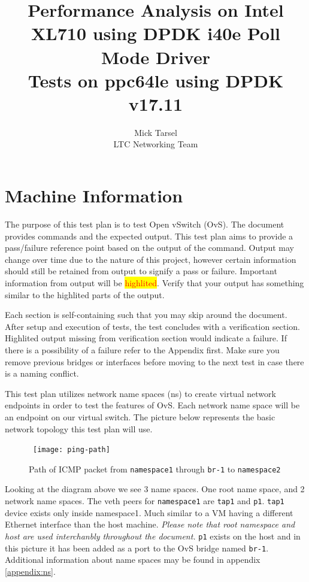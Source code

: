 \documentclass[letter]{article}
\title{Performance Analysis on Intel XL710 using DPDK i40e Poll Mode Driver \\ Tests on ppc64le using DPDK v17.11}
\author{Mick Tarsel \\  LTC Networking Team \\}
\begin{document}

\maketitle

\newpage
\tableofcontents
\newpage

\section{Machine Information}

The purpose of this test plan is to test Open vSwitch (OvS). 
The document provides commands and the expected output.
This test plan aims to provide a pass/failure reference point based on the output of the command.
Output may change over time due to the nature of this project, however certain information should still be retained from output to signify a pass or failure.
Important information from output will be \setlength{\fboxsep}{0pt}\colorbox{yellow}{{\textcolor{red}{highlited}}}. 
Verify that your output has something similar to the highlited parts of the output.

Each section is self-containing such that you may skip around the document.
After setup and execution of tests, the test concludes with a verification section. 
Highlited output missing from verification section would indicate a failure.
If there is a possibility of a failure refer to the Appendix first.
Make sure you remove previous bridges or interfaces before moving to the next test in case there is a naming conflict.

This test plan utilizes network name spaces (ns) to create virtual network endpoints in order to test the features of OvS. 
Each network name space will be an endpoint on our virtual switch. 
The picture below represents the basic network topology this test plan will use. 

\begin{figure}[H]
\caption{Path of ICMP packet from \texttt{namespace1} through \texttt{br-1} to \texttt{namespace2}}
\hbox{\hspace{-0.5cm} \texttt{[image: ping-path]} }
\end{figure}

Looking at the diagram above we see 3 name spaces. One root name space, and 2 network name spaces. The veth peers for \texttt{namespace1} are \texttt{tap1} and \texttt{p1}. \texttt{tap1} device exists only inside namespace1. Much similar to a VM having a different Ethernet interface than the host machine. \textit{Please note that root namespace and host are used interchanbly throughout the document.} \texttt{p1} exists on the host and in this picture it has been added as a port to the OvS bridge named \texttt{br-1}. Additional information about name spaces may be found in appendix \ref{appendix:ns}.
\end{document}
